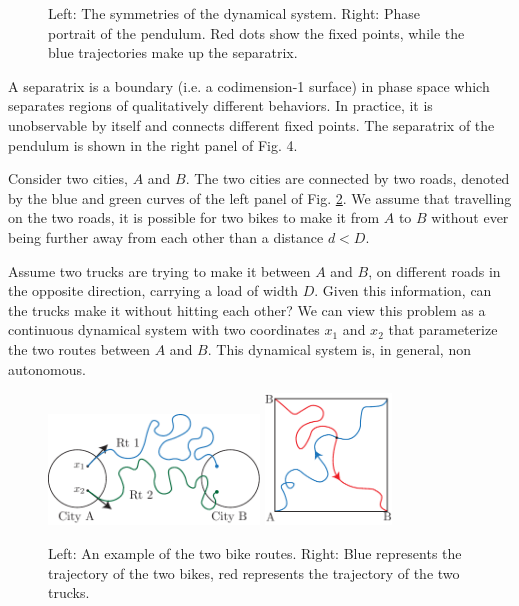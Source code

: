 \begin{ex}[Pendulum]
\begin{figure}[h!]
	\caption{Left: The symmetries of the dynamical system. Right: Phase portrait of the pendulum. Red dots show the fixed points, while the blue trajectories make up the separatrix.} \label{fig:pendulum_symm+traj}
\end{figure}
\begin{definition}
	A separatrix is a boundary (i.e. a codimension-1 surface) in phase space which separates regions of qualitatively different behaviors. In practice, it is unobservable by itself and connects different fixed points. The separatrix of the pendulum is shown in the right panel of Fig. 4.
\end{definition}

\end{ex}

\begin{ex}
	Consider two cities, $A$ and $B$. The two cities are connected by two roads, denoted by the blue and green curves of the left panel of Fig. \ref{fig:two_cities}. We assume that travelling on the two roads, it is possible for two bikes to make it from $A$ to $B$ without ever being further away from each other than a distance $d<D$.

Assume two trucks are trying to make it between $A$ and $B$, on different roads in the opposite direction, carrying a load of width $D$. Given this information, can the trucks make it without hitting each other? We can view this problem as a continuous dynamical system with two coordinates $x_1$ and $x_2$ that parameterize the two routes between $A$ and $B$. This dynamical system is, in general, non autonomous.
	\begin{figure}[h!]
		\centering
		\includegraphics[width=0.5\textwidth]{figures/intro/7routes.pdf}
		\hspace{0.05\textwidth}
		\includegraphics[width=0.3\textwidth]{figures/intro/8truck_geometry.pdf}
		\caption{Left: An example of the two bike routes. Right: Blue represents the trajectory of the two bikes, red represents the trajectory of the two trucks.} \label{fig:two_cities}
	\end{figure}


\end{ex}
